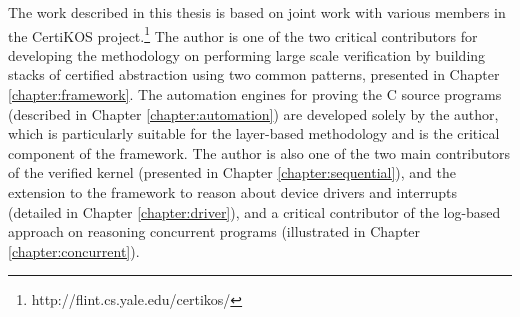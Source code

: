 %
The work described in this thesis is based on joint work with various members
in the CertiKOS project.\footnote{http://flint.cs.yale.edu/certikos/}
The author is one of the two critical contributors for developing the methodology
on performing large scale verification by building stacks of certified abstraction
using two common patterns, presented in Chapter \ref{chapter:framework}. The automation
engines for proving the C source programs (described in Chapter \ref{chapter:automation})
are developed solely by the author, which is particularly suitable for the
layer-based methodology and is the critical component of the framework. 
The author is also one of the two main contributors of the verified kernel (presented
in Chapter \ref{chapter:sequential}), and the
extension to the framework to reason about device drivers and interrupts
(detailed in Chapter \ref{chapter:driver}), and a critical contributor
of the log-based approach on reasoning
concurrent programs (illustrated in Chapter \ref{chapter:concurrent}). 

